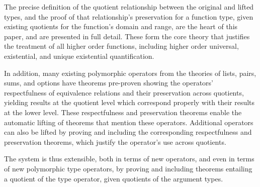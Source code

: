 \documentclass[envcountsame,runningheads]{llncs}
\newcommand{\quotient}{partial equivalence}
\begin{document}
The precise definition of the quotient relationship between the
original and lifted types, and the proof of that relationship's
preservation
for a function type,
given existing quotients
for the function's domain and range, are the heart of this paper,
and are presented in full detail.
These
form the core theory that
justifies the treatment of all higher order functions,
including higher order
universal, existential, and unique existential quantification.

In addition, many existing polymorphic operators from the theories of
lists, pairs, sums, and options have theorems pre-proven
showing the operators' respectfulness of equivalence relations and
their preservation across quotients, yielding results at the
quotient level which correspond properly with their results at the lower level.
These respectfulness and preservation theorems enable the automatic
lifting of theorems that mention these operators.  Additional operators
can also be lifted by proving
and including
the corresponding respectfulness and preservation
theorems, which justify the operator's use across quotients.

The system is thus extensible, both in terms of new operators, and even
in terms of new polymorphic type operators, by proving and including
theorems entailing
a quotient
of the type operator,
given quotients
of the
argument types.
\end{document}
